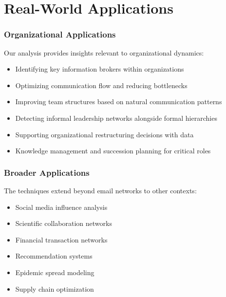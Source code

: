 \documentclass{beamer}
\begin{document}
\section{Real-World Applications}

\begin{frame}
    \frametitle{Organizational Applications}
    Our analysis provides insights relevant to organizational dynamics:
    \begin{itemize}
        \item Identifying key information brokers within organizations
        \item Optimizing communication flow and reducing bottlenecks
        \item Improving team structures based on natural communication patterns
        \item Detecting informal leadership networks alongside formal hierarchies
        \item Supporting organizational restructuring decisions with data
        \item Knowledge management and succession planning for critical roles
    \end{itemize}
\end{frame}

\begin{frame}
    \frametitle{Broader Applications}
    The techniques extend beyond email networks to other contexts:
    \begin{itemize}
        \item Social media influence analysis
        \item Scientific collaboration networks
        \item Financial transaction networks
        \item Recommendation systems
        \item Epidemic spread modeling
        \item Supply chain optimization
    \end{itemize}
\end{frame}
\end{document}
